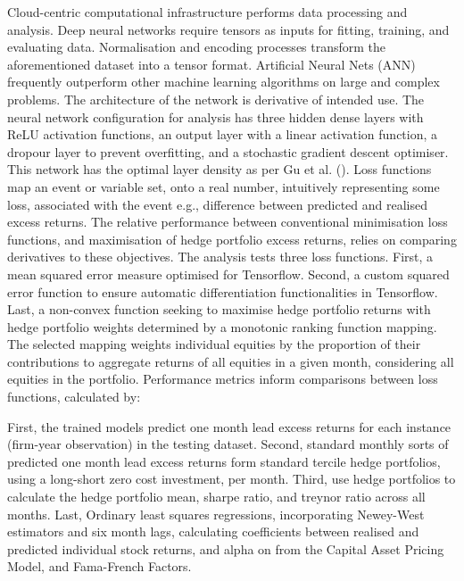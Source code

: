 Cloud-centric computational infrastructure performs data processing and analysis.
Deep neural networks require tensors as inputs for fitting, training, and evaluating data.
Normalisation and encoding processes transform the aforementioned dataset into a tensor format.
Artificial Neural Nets (ANN) frequently outperform other machine learning algorithms on large and complex problems.
The architecture of the network is derivative of intended use.
The neural network configuration for analysis has three hidden dense layers with ReLU activation functions, an output layer with a linear activation function, a dropour layer to prevent overfitting, and a stochastic gradient descent optimiser.
This network has the optimal layer density as per Gu et al. (\citeyear{eapvml}).
Loss functions map an event or variable set, onto a real number, intuitively representing some loss, associated with the event e.g., difference between predicted and realised excess returns.
The relative performance between conventional minimisation loss functions, and maximisation of hedge portfolio excess returns, relies on comparing derivatives to these objectives.
The analysis tests three loss functions. First, a mean squared error measure optimised for Tensorflow. Second, a custom squared error function to ensure automatic differentiation functionalities in Tensorflow.
Last, a non-convex function seeking to maximise hedge portfolio returns with hedge portfolio weights determined by a monotonic ranking function mapping.
The selected mapping weights individual equities by the proportion of their contributions to aggregate returns of all equities in a given month, considering all equities in the portfolio.
Performance metrics inform comparisons between loss functions, calculated by:

First, the trained models predict one month lead excess returns for each instance (firm-year observation) in the testing dataset.
Second, standard monthly sorts of predicted one month lead excess returns form standard tercile hedge portfolios, using a long-short zero cost investment, per month.
Third, use hedge portfolios to calculate the hedge portfolio mean, sharpe ratio, and treynor ratio across all months.
Last, Ordinary least squares regressions, incorporating Newey-West estimators and six month lags, calculating coefficients between realised and predicted individual stock returns, and alpha on from the Capital Asset Pricing Model, and Fama-French Factors.

